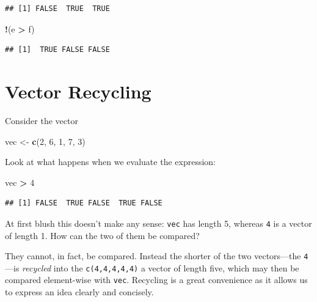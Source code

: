 \documentclass[]{book}
\makeatletter
\newenvironment{Shaded}{\begin{snugshade}}{\end{snugshade}}
\newcommand{\KeywordTok}[1]{\textcolor[rgb]{0.13,0.29,0.53}{\textbf{#1}}}
\newcommand{\DecValTok}[1]{\textcolor[rgb]{0.00,0.00,0.81}{#1}}
\newcommand{\StringTok}[1]{\textcolor[rgb]{0.31,0.60,0.02}{#1}}
\newcommand{\OperatorTok}[1]{\textcolor[rgb]{0.81,0.36,0.00}{\textbf{#1}}}
\newcommand{\NormalTok}[1]{#1}
\newenvironment{kframe}{%
\medskip{}
\setlength{\fboxsep}{.8em}
 \def\at@end@of@kframe{}%
 \ifinner\ifhmode%
  \def\at@end@of@kframe{\end{minipage}}%
  \begin{minipage}{\columnwidth}%
 \fi\fi%
 \def\FrameCommand##1{\hskip\@totalleftmargin \hskip-\fboxsep
 \colorbox{shadecolor}{##1}\hskip-\fboxsep
     \hskip-\linewidth \hskip-\@totalleftmargin \hskip\columnwidth}%
 \MakeFramed {\advance\hsize-\width
   \@totalleftmargin\z@ \linewidth\hsize
   \@setminipage}}%
 {\par\unskip\endMakeFramed%
 \at@end@of@kframe}
\renewenvironment{Shaded}{\begin{kframe}}{\end{kframe}}
\theoremstyle{definition}
\theoremstyle{definition}
\theoremstyle{definition}
\theoremstyle{remark}
\makeatother
\begin{document}
\begin{verbatim}
## [1] FALSE  TRUE  TRUE
\end{verbatim}

\begin{Shaded}
\begin{Highlighting}[]
\OperatorTok{!}\NormalTok{(e }\OperatorTok{>}\StringTok{ }\NormalTok{f)}
\end{Highlighting}
\end{Shaded}

\begin{verbatim}
## [1]  TRUE FALSE FALSE
\end{verbatim}

\section{\texorpdfstring{Vector Recycling
}{Vector Recycling }}\label{vector-recycling}

Consider the vector

\begin{Shaded}
\begin{Highlighting}[]
\NormalTok{vec <-}\StringTok{ }\KeywordTok{c}\NormalTok{(}\DecValTok{2}\NormalTok{, }\DecValTok{6}\NormalTok{, }\DecValTok{1}\NormalTok{, }\DecValTok{7}\NormalTok{, }\DecValTok{3}\NormalTok{)}
\end{Highlighting}
\end{Shaded}

Look at what happens when we evaluate the expression:

\begin{Shaded}
\begin{Highlighting}[]
\NormalTok{vec }\OperatorTok{>}\StringTok{ }\DecValTok{4}
\end{Highlighting}
\end{Shaded}

\begin{verbatim}
## [1] FALSE  TRUE FALSE  TRUE FALSE
\end{verbatim}

At first blush this doesn't make any sense: \texttt{vec} has length 5,
whereas \texttt{4} is a vector of length 1. How can the two of them be
compared?

They cannot, in fact, be compared. Instead the shorter of the two
vectors---the \texttt{4}---is \emph{recycled} into the
\texttt{c(4,4,4,4,4)} a vector of length five, which may then be
compared element-wise with \texttt{vec}. Recycling is a great
convenience as it allows us to express an idea clearly and concisely.
\end{document}
